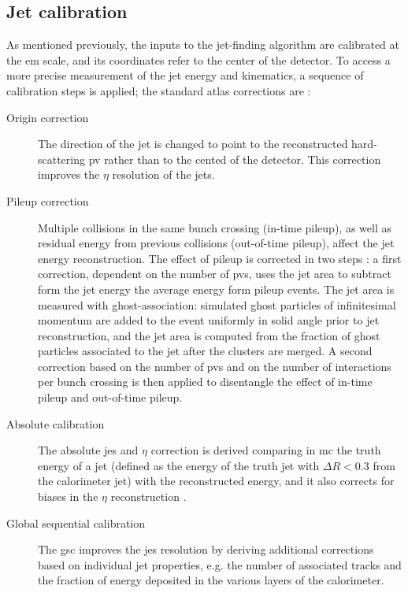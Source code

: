 \subsection{Jet calibration}
\label{sec:obj:jetcalib}

As mentioned previously, the inputs to the jet-finding algorithm are calibrated at the \gls{em} scale, and its coordinates refer to the center of the detector. To access a more precise measurement of the jet energy and kinematics, a sequence of calibration steps is applied; 
the standard \gls{atlas} corrections are \cite{PhysRevD.96.072002}:

\begin{description}
\item[Origin correction] The direction of the jet is changed to point to the reconstructed hard-scattering \gls{pv} rather than to the cented of the detector. This correction improves the $\eta$ resolution of the jets.

\item[Pileup correction] Multiple collisions in the same bunch crossing (in-time pileup), as well as residual energy from previous collisions (out-of-time pileup), affect the jet energy reconstruction. The effect of pileup is corrected in two steps 
\cite{Cacciari:2007fd,ATLAS-CONF-2013-083}: a first correction, dependent on the number of \glspl{pv}, uses the jet area to subtract form the jet energy the average energy form pileup events. 
The jet area is measured with ghost-association: simulated ghost particles of infinitesimal momentum are added to the event uniformly in solid angle prior to jet reconstruction, and the jet area is computed from the fraction of ghost particles associated to the jet after the clusters are merged. 
A second correction based on the number of \glspl{pv} and on the number of interactions per bunch crossing is then applied to disentangle the effect of in-time pileup and out-of-time pileup.

\item[Absolute calibration] The absolute \gls{jes} and $\eta$ correction is derived comparing in \gls{mc} the truth energy of a jet 
(defined as the energy of the truth jet with $\Delta R<0.3$ from the calorimeter jet) 
with the reconstructed energy, and it also corrects for biases in the $\eta$ reconstruction \cite{Aad2015jets}.

\item[Global sequential calibration] The \gls{gsc} \cite{ATLAS-CONF-2015-002} improves the \gls{jes} resolution by deriving additional corrections based on individual jet properties, e.g. the number of associated tracks and the fraction of energy deposited in the various layers of the calorimeter.


\end{description}
